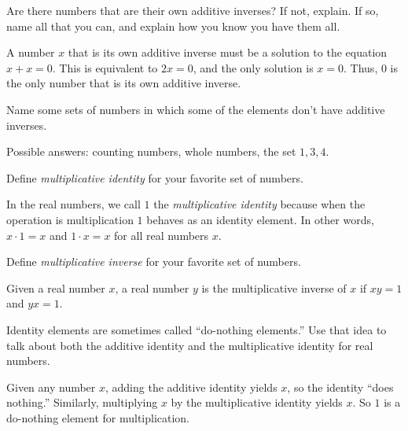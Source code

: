 \documentclass[space,handout,nooutcomes]{ximera}
\begin{document}
\begin{question}
Are there numbers that are their own additive inverses?  If not,
explain.  If so, name all that you can, and explain how you know you
have them all.
\begin{freeResponse}
A number $x$ that is its own additive inverse must be a solution to
the equation $x+x = 0$.  This is equivalent to $2x=0$, and the only
solution is $x=0$.  Thus, 0 is the only number that is its own
additive inverse.
\end{freeResponse}
\end{question}

\begin{question}
Name some sets of numbers in which some of the elements don't have
additive inverses.
\begin{freeResponse}
Possible answers: counting numbers, whole numbers, the set ${1, 3,
  4}$.
\end{freeResponse}
\end{question}

\begin{question}Define \emph{multiplicative identity} for your favorite set of numbers.  
\begin{freeResponse}
In the real numbers, we call $1$ the \emph{multiplicative identity} because when the operation is multiplication 
$1$ behaves as an identity element.  
In other words, $x\cdot 1=x$ and $1\cdot x=x$ for all real numbers $x$.  
\end{freeResponse}
\end{question}

\begin{question}Define \emph{multiplicative inverse} for your favorite set of numbers.  
\begin{freeResponse}
Given a real number $x$, a real number $y$ is the multiplicative inverse of $x$ if $xy=1$ and $yx=1$.  
\end{freeResponse}
\end{question}

\begin{question}Identity elements are sometimes called ``do-nothing elements.''  Use that idea to talk about both the additive identity and the multiplicative identity for real numbers.  
\begin{freeResponse}
Given any number $x$, adding the additive identity yields $x$, so the identity ``does nothing.''  Similarly, multiplying $x$ by the multiplicative identity yields $x$.  So $1$ is a do-nothing element for multiplication.  
\end{freeResponse}
\end{question}
\end{document}

